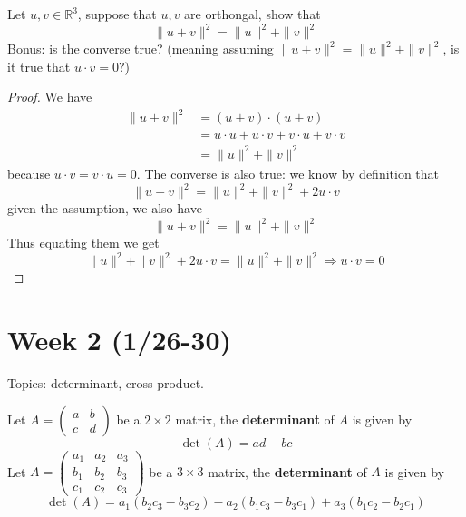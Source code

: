 \documentclass[openany]{book}
\newcommand{\R}{\mathbb{R}}
\begin{document}
\begin{prob}
    Let $u,v\in\R^3$, suppose that $u,v$ are orthongal, show that 
    \begin{equation*}
        \|u+v\|^2=\|u\|^2+\|v\|^2
    \end{equation*}
    Bonus: is the converse true? (meaning assuming $ \|u+v\|^2=\|u\|^2+\|v\|^2$, is it true that $u\cdot v=0$?)
\end{prob}
\begin{proof}
    We have 
    \begin{align*}
        \|u+v\|^2&=(u+v)\cdot(u+v)\\
        &=u\cdot u+u\cdot v+v\cdot u+v\cdot v\\
        &=\|u\|^2+\|v\|^2
    \end{align*}
    because $u\cdot v=v\cdot u=0$. The converse is also true: we know by definition that
    \begin{equation*}
        \|u+v\|^2=\|u\|^2+\|v\|^2+2u\cdot v
    \end{equation*}
    given the assumption, we also have 
    \begin{equation*}
        \|u+v\|^2=\|u\|^2+\|v\|^2
    \end{equation*}
    Thus equating them we get 
    \begin{equation*}
        \|u\|^2+\|v\|^2+2u\cdot v=\|u\|^2+\|v\|^2\Rightarrow u\cdot v=0
    \end{equation*}
\end{proof}




\newpage

\section*{\centering Week 2 (1/26-30)}
Topics: determinant, cross product.

\begin{defn}[determinant]
    Let $A=\begin{pmatrix}
        a&b\\
        c&d
    \end{pmatrix}$ be a $2\times 2$ matrix, the \textbf{determinant} of $A$ is given by 
    \begin{equation*}
        \det(A)=ad-bc
    \end{equation*}
    Let $A=\begin{pmatrix}
        a_1&a_2&a_3\\
        b_1&b_2&b_3\\
        c_1&c_2&c_3
    \end{pmatrix}$ be a $3\times 3$ matrix, the \textbf{determinant} of $A$ is given by
    \begin{equation*}
        \det(A)=a_1(b_2c_3-b_3c_2)-a_2(b_1c_3-b_3c_1)+a_3(b_1c_2-b_2c_1)
    \end{equation*}
\end{defn}
\end{document}
